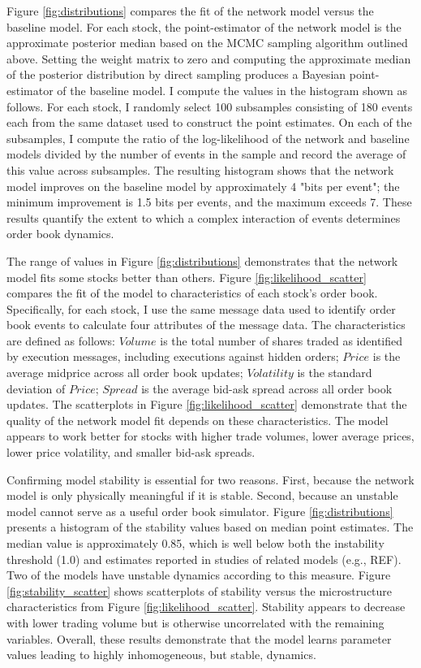 Figure \ref{fig:distributions} compares the fit of the network model versus the baseline model. For each stock, the point-estimator of the network model is the approximate posterior median based on the MCMC sampling algorithm outlined above. Setting the weight matrix to zero and computing the approximate median of the posterior distribution by direct sampling produces a Bayesian point-estimator of the baseline model. I compute the values in the histogram shown as follows. For each stock, I randomly select 100 subsamples consisting of 180 events each from the same dataset used to construct the point estimates. On each of the subsamples, I compute the ratio of the log-likelihood of the network and baseline models divided by the number of events in the sample and record the average of this value across subsamples. The resulting histogram shows that the network model improves on the baseline model by approximately 4 "bits per event"; the minimum improvement is 1.5 bits per events, and the maximum exceeds 7. These results quantify the extent to which a complex interaction of events determines order book dynamics.

The range of values in Figure \ref{fig:distributions} demonstrates that the network model fits some stocks better than others. Figure \ref{fig:likelihood_scatter} compares the fit of the model to characteristics of each stock’s order book. Specifically, for each stock, I use the same message data used to identify order book events to calculate four attributes of the message data. The characteristics are defined as follows: $Volume$ is the total number of shares traded as identified by execution messages, including executions against hidden orders; $Price$ is the average midprice across all order book updates; $Volatility$ is the standard deviation of $Price$; $Spread$ is the average bid-ask spread across all order book updates. The scatterplots in Figure \ref{fig:likelihood_scatter} demonstrate that the quality of the network model fit depends on these characteristics. The model appears to work better for stocks with higher trade volumes, lower average prices, lower price volatility, and smaller bid-ask spreads.

Confirming model stability is essential for two reasons. First, because the network model is only physically meaningful if it is stable. Second, because an unstable model cannot serve as a useful order book simulator. Figure \ref{fig:distributions} presents a histogram of the stability values based on median point estimates. The median value is approximately 0.85, which is well below both the instability threshold (1.0) and estimates reported in studies of related models (e.g., REF). Two of the models have unstable dynamics according to this measure. Figure \ref{fig:stability_scatter} shows scatterplots of stability versus the microstructure characteristics from Figure \ref{fig:likelihood_scatter}. Stability appears to decrease with lower trading volume but is otherwise uncorrelated with the remaining variables. Overall, these results demonstrate that the model learns parameter values leading to highly inhomogeneous, but stable, dynamics.

